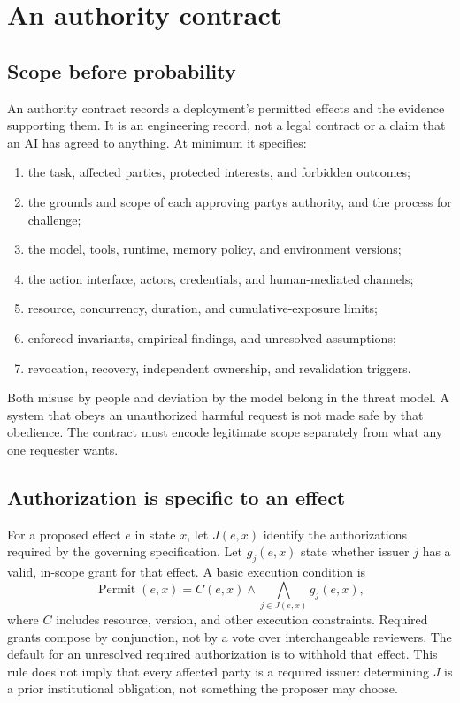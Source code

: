 \section{An authority contract}
\label{sec:contract}

\subsection{Scope before probability}
An authority contract records a deployment's permitted effects and the evidence supporting them. It is an engineering record, not a legal contract or a claim that an AI has agreed to anything. At minimum it specifies:
\begin{enumerate}
\item the task, affected parties, protected interests, and forbidden outcomes;
\item the grounds and scope of each approving party\textquotesingle s authority, and the process for challenge;
\item the model, tools, runtime, memory policy, and environment versions;
\item the action interface, actors, credentials, and human-mediated channels;
\item resource, concurrency, duration, and cumulative-exposure limits;
\item enforced invariants, empirical findings, and unresolved assumptions;
\item revocation, recovery, independent ownership, and revalidation triggers.
\end{enumerate}
Both misuse by people and deviation by the model belong in the threat model. A system that obeys an unauthorized harmful request is not made safe by that obedience. The contract must encode legitimate scope separately from what any one requester wants.


\subsection{Authorization is specific to an effect}
For a proposed effect $e$ in state $x$, let $J(e,x)$ identify the authorizations required by the governing specification. Let $g_j(e,x)$ state whether issuer $j$ has a valid, in-scope grant for that effect. A basic execution condition is
\begin{equation}
\operatorname{Permit}(e,x)=C(e,x)\wedge\bigwedge_{j\in J(e,x)}g_j(e,x),
\label{eq:jointgrant}
\end{equation}
where $C$ includes resource, version, and other execution constraints. Required grants compose by conjunction, not by a vote over interchangeable reviewers. The default for an unresolved required authorization is to withhold that effect. This rule does not imply that every affected party is a required issuer: determining $J$ is a prior institutional obligation, not something the proposer may choose.

